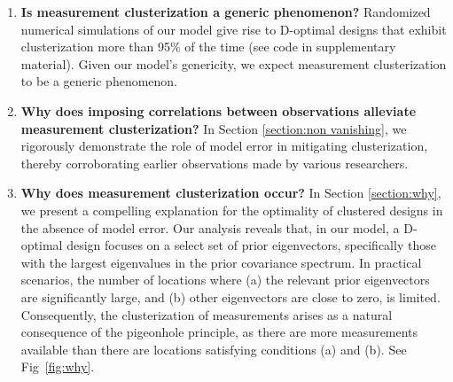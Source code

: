 \begin{enumerate}

\item \label{q:generic} \textbf{Is measurement clusterization a
  generic phenomenon?}
  Randomized numerical simulations of our model give rise to D-optimal
  designs that exhibit clusterization more than 95\% of the time (see
  code in supplementary material). Given our model's genericity, we
  expect measurement clusterization to be a generic phenomenon.

\item \label{q:mitigate} \textbf{Why does imposing correlations
  between observations alleviate measurement clusterization?} In
  Section \ref{section:non vanishing}, we rigorously demonstrate the
  role of model error in mitigating clusterization, thereby
  corroborating earlier observations made by various researchers.

\item \label{q:why} \textbf{Why does measurement clusterization
  occur?} In Section \ref{section:why}, we present a compelling
  explanation for the optimality of clustered designs in the absence
  of model error. Our analysis reveals that, in our model, a D-optimal
  design focuses on a select set of prior eigenvectors, specifically
  those with the largest eigenvalues in the prior covariance
  spectrum. In practical scenarios, the number of locations where (a)
  the relevant prior eigenvectors are significantly large, and (b)
  other eigenvectors are close to zero, is limited. Consequently, the
  clusterization of measurements arises as a natural consequence of
  the pigeonhole principle, as there are more measurements available
  than there are locations satisfying conditions (a) and (b). See
  Fig~\ref{fig:why}.




\end{enumerate}
